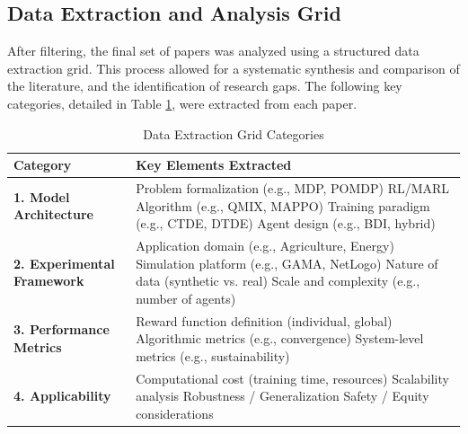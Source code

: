 \documentclass[conference]{IEEEtran}
\begin{document}
\subsection{Data Extraction and Analysis Grid}

After filtering, the final set of papers was analyzed using a structured data extraction grid. This process allowed for a systematic synthesis and comparison of the literature, and the identification of research gaps. The following key categories, detailed in Table \ref{tab:grid}, were extracted from each paper.

\begin{table}[htbp]
\caption{Data Extraction Grid Categories}
\begin{center}
\begin{tabularx}{\columnwidth}{|l|X|}
\hline
\textbf{Category} & \textbf{Key Elements Extracted} \\
\hline
\textbf{1. Model Architecture} & 
Problem formalization (e.g., MDP, POMDP) \newline
RL/MARL Algorithm (e.g., QMIX, MAPPO) \newline
Training paradigm (e.g., CTDE, DTDE) \newline
Agent design (e.g., BDI, hybrid)
\\
\hline
\textbf{2. Experimental Framework} & 
Application domain (e.g., Agriculture, Energy) \newline
Simulation platform (e.g., GAMA, NetLogo) \newline
Nature of data (synthetic vs. real) \newline
Scale and complexity (e.g., number of agents)
\\
\hline
\textbf{3. Performance Metrics} & 
Reward function definition (individual, global) \newline
Algorithmic metrics (e.g., convergence) \newline
System-level metrics (e.g., sustainability)
\\
\hline
\textbf{4. Applicability} & 
Computational cost (training time, resources) \newline
Scalability analysis \newline
Robustness / Generalization \newline
Safety / Equity considerations
\\
\hline
\end{tabularx}
\label{tab:grid}
\end{center}
\end{table}
\end{document}
